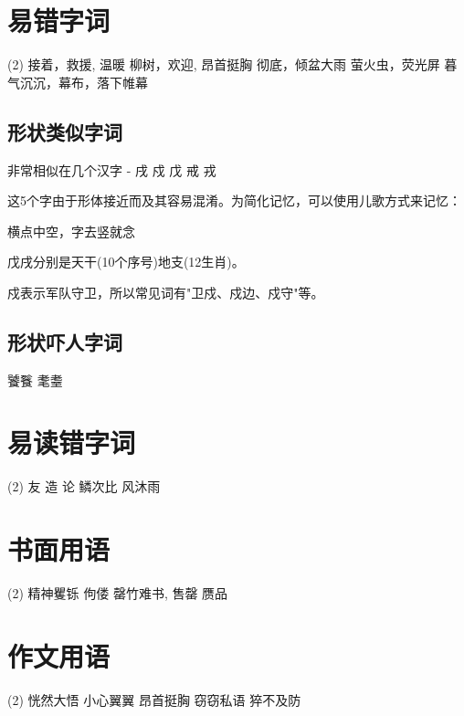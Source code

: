 
\section{易错字词}

\begin{tasks}[style=enumerate](2)
    \task 接着，救援, 温暖
    \task 柳树，欢迎, 昂首挺胸
    \task 彻底，倾盆大雨
    \task 萤火虫，荧光屏
    \task 暮气沉沉，幕布，落下帷幕
\end{tasks}

  \subsection{形状类似字词}
非常相似在几个汉字 - 戌 戍 戊 戒 戎

这5个字由于形体接近而及其容易混淆。为简化记忆，可以使用儿歌方式来记忆：

  \begin{center}横点中空，字去竖就念\end{center}

  戊戌分别是天干(10个序号)地支(12生肖)。

  戍表示军队守卫，所以常见词有"卫戍、戍边、戍守"等。

  \subsection{形状吓人字词}
饕餮 耄耋

\section{易读错字词}
\begin{tasks}[style=enumerate](2)
    \task 友
    \task 造
    \task {}论
    \task 鳞次比
    \task {}风沐雨
\end{tasks}


\section{书面用语}

\begin{tasks}[style=enumerate](2)
    \task 精神矍铄  
    \task 佝偻      
    \task 罄竹难书, 售罄 
    \task 赝品      
\end{tasks}

\section{作文用语}

\begin{tasks}[style=enumerate](2)
    \task 恍然大悟  
    \task 小心翼翼      
    \task 昂首挺胸  
    \task 窃窃私语  
    \task 猝不及防   
\end{tasks}